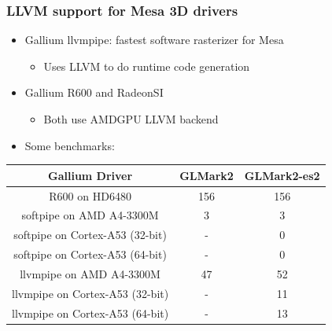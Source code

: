 \documentclass{smilebeamer}
\begin{document}
\begin{frame}
\frametitle{LLVM support for Mesa 3D drivers}
\begin{itemize}
  \item Gallium llvmpipe: fastest software rasterizer for Mesa
  \begin{itemize}
    \item Uses LLVM to do runtime code generation
  \end{itemize}
  \item Gallium R600 and RadeonSI
  \begin{itemize}
    \item Both use AMDGPU LLVM backend
  \end{itemize}
    \item Some benchmarks:
\end{itemize}
\centering
  \begin{tabular}{c|c|c}
  \textbf{Gallium Driver} & \textbf{GLMark2} & \textbf{GLMark2-es2} \\
  \hline
  R600 on HD6480 & 156 & 156 \\
  softpipe on AMD A4-3300M & 3 & 3 \\
  softpipe on Cortex-A53 (32-bit) & - & 0 \\
  softpipe on Cortex-A53 (64-bit) & - & 0 \\
  llvmpipe on AMD A4-3300M & 47 & 52 \\
  llvmpipe on Cortex-A53 (32-bit) & - & 11 \\
  llvmpipe on Cortex-A53 (64-bit) & - & 13 \\
  \end{tabular}
\end{frame}

\end{document}
